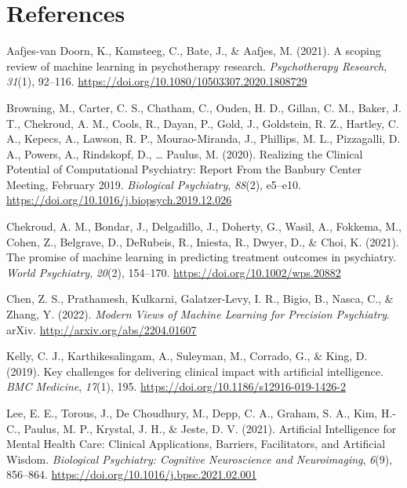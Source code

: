 \documentclass[
  man]{apa7}
\newlength{\cslhangindent}
\newlength{\cslentryspacingunit} %
\newenvironment{CSLReferences}[2] %
 {%
  \setlength{\parindent}{0pt}
  \ifodd #1
  \let\oldpar\par
  \def\par{\hangindent=\cslhangindent\oldpar}
  \fi
  \setlength{\parskip}{#2\cslentryspacingunit}
 }%
 {}
\begin{document}
\newpage

\hypertarget{references}{%
\section{References}\label{references}}

\hypertarget{refs}{}
\begin{CSLReferences}{1}{0}
\leavevmode{}%
Aafjes-van Doorn, K., Kamsteeg, C., Bate, J., \& Aafjes, M. (2021). A scoping review of machine learning in psychotherapy research. \emph{Psychotherapy Research}, \emph{31}(1), 92--116. \url{https://doi.org/10.1080/10503307.2020.1808729}

\leavevmode{}%
Browning, M., Carter, C. S., Chatham, C., Ouden, H. D., Gillan, C. M., Baker, J. T., Chekroud, A. M., Cools, R., Dayan, P., Gold, J., Goldstein, R. Z., Hartley, C. A., Kepecs, A., Lawson, R. P., Mourao-Miranda, J., Phillips, M. L., Pizzagalli, D. A., Powers, A., Rindskopf, D., \ldots{} Paulus, M. (2020). Realizing the {Clinical} {Potential} of {Computational} {Psychiatry}: {Report} {From} the {Banbury} {Center} {Meeting}, {February} 2019. \emph{Biological Psychiatry}, \emph{88}(2), e5--e10. \url{https://doi.org/10.1016/j.biopsych.2019.12.026}

\leavevmode{}%
Chekroud, A. M., Bondar, J., Delgadillo, J., Doherty, G., Wasil, A., Fokkema, M., Cohen, Z., Belgrave, D., DeRubeis, R., Iniesta, R., Dwyer, D., \& Choi, K. (2021). The promise of machine learning in predicting treatment outcomes in psychiatry. \emph{World Psychiatry}, \emph{20}(2), 154--170. \url{https://doi.org/10.1002/wps.20882}

\leavevmode{}%
Chen, Z. S., Prathamesh, Kulkarni, Galatzer-Levy, I. R., Bigio, B., Nasca, C., \& Zhang, Y. (2022). \emph{Modern {Views} of {Machine} {Learning} for {Precision} {Psychiatry}}. arXiv. \url{http://arxiv.org/abs/2204.01607}

\leavevmode{}%
Kelly, C. J., Karthikesalingam, A., Suleyman, M., Corrado, G., \& King, D. (2019). Key challenges for delivering clinical impact with artificial intelligence. \emph{BMC Medicine}, \emph{17}(1), 195. \url{https://doi.org/10.1186/s12916-019-1426-2}

\leavevmode{}%
Lee, E. E., Torous, J., De Choudhury, M., Depp, C. A., Graham, S. A., Kim, H.-C., Paulus, M. P., Krystal, J. H., \& Jeste, D. V. (2021). Artificial {Intelligence} for {Mental} {Health} {Care}: {Clinical} {Applications}, {Barriers}, {Facilitators}, and {Artificial} {Wisdom}. \emph{Biological Psychiatry: Cognitive Neuroscience and Neuroimaging}, \emph{6}(9), 856--864. \url{https://doi.org/10.1016/j.bpsc.2021.02.001}


\end{CSLReferences}
\end{document}
